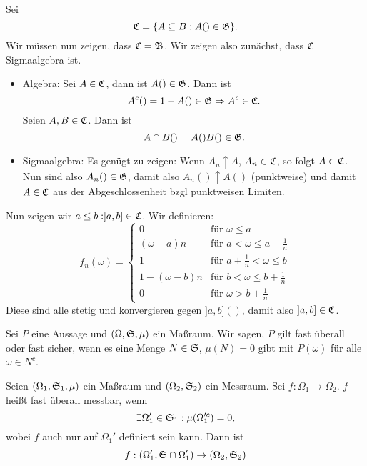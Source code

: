 \begin{bew}
\begin{itemize}
					Sei 
					\[ \mathfrak{C}=\{A\subseteq B: A()\in\mathfrak{G}\}. \]
					Wir müssen nun zeigen, dass $\mathfrak{C}=\mathfrak{B}$. Wir zeigen also zunächst, dass $\mathfrak{C}$ Sigmaalgebra ist. 
					\begin{itemize}
						\item Algebra:\newline
						Sei $A\in\mathfrak{C}$, dann ist $A()\in\mathfrak{G}$. Dann ist
						\[ A^c()=1-A()\in\mathfrak{G}\Rightarrow A^c\in\mathfrak{C}. \]
						Seien $A,B\in\mathfrak{C}$. Dann ist 
						\[ A\cap B()=A()B()\in\mathfrak{G}. \]
						\item Sigmaalgebra:\newline
						Es genügt zu zeigen: Wenn $A_n\uparrow A$, $A_n\in\mathfrak{C}$, so folgt $A\in\mathfrak{C}$. Nun sind also $A_n()\in\mathfrak{G}$, damit also $A_n()\uparrow A()$ (punktweise) und damit $A\in\mathfrak{C}$ aus der Abgeschlossenheit bzgl punktweisen Limiten. 
					\end{itemize}
					Nun zeigen wir $a\le b: ]a,b]\in\mathfrak{C}$. Wir definieren:
					\[ f_n(\omega)=\left\{\begin{array}{ll}
					0&\text{für } \omega \le a\\
					(\omega-a)n&\text{für }a<\omega\le a+\frac{1}{n}\\
					1&\text{für }a+\frac{1}{n}<\omega\le b\\
					1-(\omega-b)n&\text{für }b<\omega\le b+\frac{1}{n}\\
					0&\text{für } \omega >b+\frac{1}{n}
					\end{array}\right. \]
					Diese sind alle stetig und konvergieren gegen $]a,b]()$, damit also $]a,b]\in\mathfrak{C}$. 
				\end{itemize}
			\end{bew}
			
			\begin{defi}
				Sei $P$ eine Aussage und $(\Omega,\mathfrak{S}, \mu)$ ein Maßraum. Wir sagen, $P$ gilt fast überall oder fast sicher, wenn es eine Menge $N\in\mathfrak{S}$, $\mu(N)=0$ gibt mit $P(\omega)$ für alle $\omega \in N^c$.
			\end{defi}
			
			\begin{defi}
				Seien $(\Omega_1,\mathfrak{S}_1,\mu)$ ein Maßraum und $(\Omega_2,\mathfrak{S}_2)$ ein Messraum. Sei $f:\Omega_1\to\Omega_2$. $f$ heißt fast überall messbar, wenn
				\[ \exists \Omega_1'\in\mathfrak{S}_1: \mu(\Omega_1'^c)=0, \]
				wobei $f$ auch nur auf $\Omega_1'$ definiert sein kann. Dann ist
				\[ f:(\Omega_1',\mathfrak{S}\cap\Omega_1')\to(\Omega_2,\mathfrak{S}_2) \]
			\end{defi}
			
